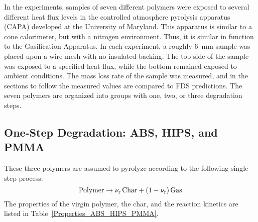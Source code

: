 In the experiments, samples of seven different polymers were exposed to several different heat flux levels in the controlled atmosphere pyrolysis apparatus (CAPA) developed at the University of Maryland. This apparatus is similar to a cone calorimeter, but with a nitrogen environment. Thus, it is similar in function to the Gasification Apparatus. In each experiment, a roughly 6~mm sample was placed upon a wire mesh with no insulated backing. The top side of the sample was exposed to a specified heat flux, while the bottom remained exposed to ambient conditions. The mass loss rate of the sample was measured, and in the sections to follow the measured values are compared to FDS predictions. The seven polymers are organized into groups with one, two, or three degradation steps.

\subsection{One-Step Degradation: ABS, HIPS, and PMMA}

These three polymers are assumed to pyrolyze according to the following single step process:
\begin{equation}
   \hbox{Polymer}  \to \nu_{\rm r} \, \hbox{Char} + (1-\nu_{\rm r}) \, \hbox{Gas}
\end{equation}
The properties of the virgin polymer, the char, and the reaction kinetics are listed in Table~\ref{Properties_ABS_HIPS_PMMA}.

